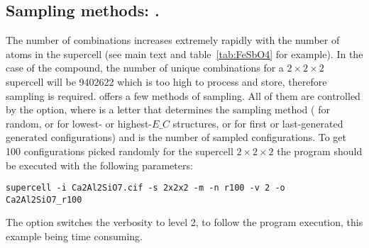 \documentclass[a4paper,10pt]{article}
\begin{document}
\subsection*{Sampling methods: .}

The number of combinations increases extremely rapidly with the number of atoms in the supercell (see main text and table~\ref{tab:FeSbO4} for example). In the case of the  compound, the number of unique combinations for a $2\times2\times2$ supercell will be \num{9402622} which is too high to process and store, therefore sampling is required. \Sups{} offers a few methods of sampling. All of them are controlled by the  option, where  is a letter that determines the sampling method ( for random,  or  for lowest- or highest-$E\_C$ structures,  or  for first or last-generated generated configurations) and  is the number of sampled configurations. To get \num{100} configurations picked randomly for the supercell $2\times2\times2$ the program should be executed with the following parameters:
\begin{Verbatim}[breaklines]
supercell -i Ca2Al2SiO7.cif -s 2x2x2 -m -n r100 -v 2 -o Ca2Al2SiO7_r100
\end{Verbatim}
The option  switches the verbosity to level 2, to follow the program execution, this example being time consuming.
\end{document}
